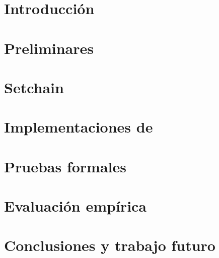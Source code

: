 \documentclass[a4paper, 11pt]{book}
\begin{document}
\begin{sloppypar}

% 

\chapter{Introducción}\label{chapter:introduction}


\chapter{Preliminares}\label{chapter:prelimnaries}


\chapter{Setchain}\label{chapter:setchain}


\chapter{Implementaciones de \setchain}\label{chapter:sol}


\chapter{Pruebas formales}\label{chapter:proofs}


\chapter{Evaluación empírica}\label{chapter:evaluation}


\chapter{Conclusiones y trabajo futuro}\label{chapter:conclusions}



\end{sloppypar}
\end{document}
